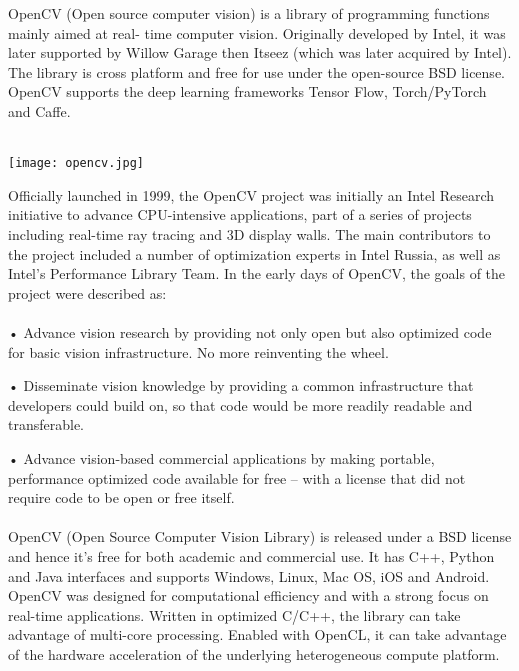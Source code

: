 \documentclass[12pt,a4paper]{report}
\begin{document}
OpenCV (Open source computer vision) is a library of programming functions mainly
aimed at real- time computer vision. Originally developed by Intel, it was later supported
by Willow Garage then Itseez (which was later acquired by Intel). The library is cross
platform and free for use under the open-source BSD license. OpenCV supports the deep
learning frameworks Tensor Flow, Torch/PyTorch and Caffe.\\\\
\begin{center}
\texttt{[image: opencv.jpg]}
\begin{figure}[h!]
\caption{}
\end{figure}
\end{center}
Officially launched in 1999, the OpenCV project was initially an Intel Research initiative
to advance CPU-intensive applications, part of a series of projects including real-time ray
tracing and 3D display walls. The main contributors to the project included a number
of optimization experts in Intel Russia, as well as Intel’s Performance Library Team. In
the early days of OpenCV, the goals of the project were described as:\\\\

• Advance vision research by providing not only open but also optimized code for
basic vision infrastructure. No more reinventing the wheel.

• Disseminate vision knowledge by providing a common infrastructure that developers
could build on, so that code would be more readily readable and transferable.

• Advance vision-based commercial applications by making portable, performance
optimized code available for free – with a license that did not require code to be
open or free itself.\\\\
OpenCV (Open Source Computer Vision Library) is released under a BSD license and
hence it’s free for both academic and commercial use. It has C++, Python and Java
interfaces and supports Windows, Linux, Mac OS, iOS and Android. OpenCV was designed for computational efficiency and with a strong focus on real-time applications.
Written in optimized C/C++, the library can take advantage of multi-core processing.
Enabled with OpenCL, it can take advantage of the hardware acceleration of the underlying heterogeneous compute platform.\\\\
\end{document}
